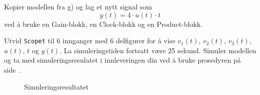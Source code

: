 
\item
  Kopier modellen fra g) og lag et nytt signal som
  \begin{equation}
    \label{eq:209}
    y(t) = 4{\cdot} u(t) {\cdot} t
  \end{equation}
  ved å bruke en {\sf  Gain}-blokk, en {\sf  Clock}-blokk og
  en {\sf  Product}-blokk.

  Utvid {\tt Scopet} til 6 innganger med 6 delfigurer for å vise $v_{1}(t)$,
  $v_{2}(t)$, $v_{3}(t)$,  $u(t)$, $t$ og $y(t)$.
    {\color{red}La simuleringstiden fortsatt være 25 sekund.  }
    Simuler modellen og ta med simuleringsresulatet
    i innleveringen din
    ved å bruke prosedyren på
     side~\pageref{page:prosedyre}.

  \begin{figure}[H]
    \centering
    \hspace*{0mm}
    \caption{Simuleringsresultatet}
  \end{figure}

